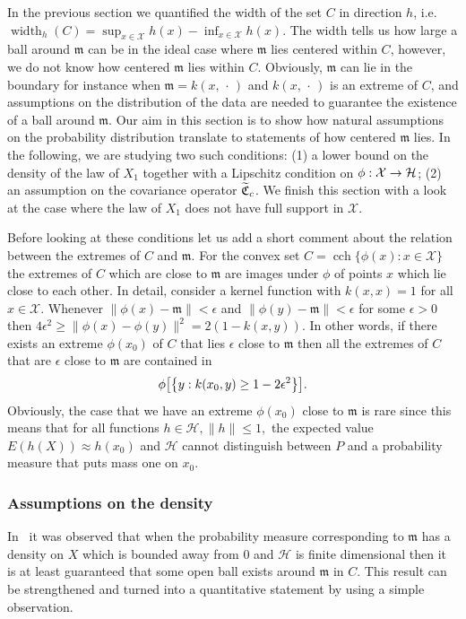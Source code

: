 \documentclass[10pt]{amsart}
\theoremstyle{definition}\newtheorem{defi}[theo]{Definition}\newtheorem{rema}[theo]{Remark}\newtheorem{exam}[theo]{Example}\newtheorem{exem}[theo]{Example}\newtheorem{nota}[theo]{Notation}
\theoremstyle{remark}
\DeclareMathOperator{\cch}{cch}
\DeclareMathOperator{\diam}{width}
\newcommand{\X}{\mathcal{X}}
\newcommand{\cH}{\mathcal{H}}
\newcommand{\fkC}{\mathfrak{C}}
\newcommand{\mean}{\mathfrak{m}}
\let\oldtilde\tilde
\renewcommand*{\tilde}[1]{\mathchoice{\widetilde{#1}}{\widetilde{#1}}{\oldtilde{#1}}{\oldtilde{#1}}}
\renewcommand*{\to}{\mathchoice{\longrightarrow}{\rightarrow}{\rightarrow}{\rightarrow}}
\let\originalleft\left
\let\originalright\right
\renewcommand{\left}{\mathopen{}\mathclose\bgroup\originalleft}
\renewcommand{\right}{\aftergroup\egroup\originalright}
\begin{document}
In the previous section we quantified the width of the set $C$ in direction $h$, i.e. $\diam_h(C) = \sup_{x \in \X} h(x) - \inf_{x\in\X} h(x)$. The width tells us how large a ball around $\mean$ can be in the ideal case where $\mean$ lies centered within $C$, however, we do not know how centered $\mean$ lies within $C$. Obviously, $\mean$ can lie in the boundary for instance when $\mean = k(x,\,\cdot\,)$ and $k(x,\,\cdot\,)$ is an extreme of $C$, and assumptions on the distribution of the data are needed to guarantee the existence of a ball around $\mean$. Our aim in this section is to show how natural assumptions on the probability distribution translate to statements of how centered $\mean$ lies. In the following, we are studying two such conditions: (1) a lower bound on the density of the law of $X_1$ together with a Lipschitz condition on $\phi:\X \to \cH$; (2) an assumption on the covariance operator $\tilde{\fkC}_c$. We finish this section with a look at the case where the law of $X_1$ does not have full support in $\X$.

Before looking at these conditions let us add a short comment about the relation between the extremes of $C$ and $\mean$. For the convex set $C = \cch\{ \phi(x) : x \in \X\}$ the extremes of $C$ which are close to $\mean$ are images under $\phi$ of points $x$ which lie close to each other. In detail, consider a kernel function with $k(x,x) = 1$ for all $x\in \X$. Whenever $\|\phi(x) - \mean\| < \epsilon$ and $\|\phi(y) - \mean \| < \epsilon$ for some $\epsilon > 0$ then $4\epsilon^2 \geq \|\phi(x) - \phi(y)\|^2 = 2(1-k(x,y))$. In other words, if there exists an extreme $\phi(x_0)$ of $C$ that lies $\epsilon$ close to $\mean$ then all the extremes of $C$ that are $\epsilon$ close to $\mean$ are contained in
\[
\phi\left[\left\{y : k(x_0,y) \geq 1- 2 \epsilon^2 \right\}\right].
\]
Obviously, the case that we have an extreme $\phi(x_0)$ close to $\mean$ is rare since this means that for all functions $h \in \cH, \|h\| \leq 1,$ the expected value $E(h(X)) \approx h(x_0)$ and $\cH$ cannot distinguish between $P$ and a probability measure that puts mass one on $x_0$.



\subsubsection{Assumptions on the density} \label{sec:assumption_density}
In~\cite{BACH12} it was observed that when the probability measure corresponding to $\mean$ has a density on $X$ which is bounded away from $0$ and $\cH$ is finite dimensional then it is at least guaranteed that some open ball exists around $\mean$ in $C$. This result can be strengthened and turned into a quantitative statement by using a simple observation.
\end{document}
